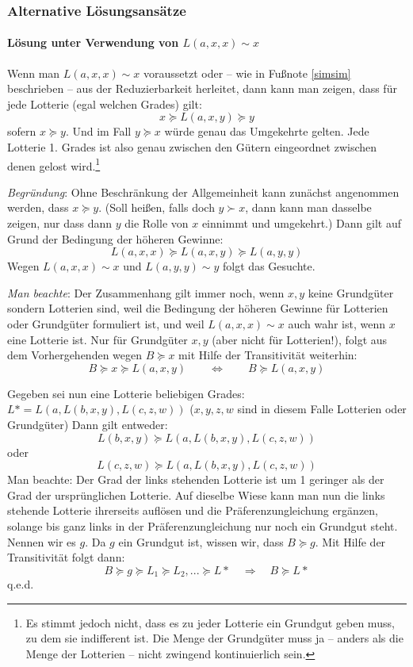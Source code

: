 \documentclass[10pt, a4paper, german]{article}
\numberwithin {equation}{section}
\begin{document}
\subsubsection{Alternative Lösungsansätze}
\label{AlternativLoesung}

\paragraph{Lösung unter Verwendung von $L(a,x,x) \sim x$\\}

Wenn man $L(a,x,x) \sim x$ voraussetzt oder -- wie in Fußnote
\ref{simsim} beschrieben -- aus der Reduzierbarkeit herleitet, dann
kann man zeigen, dass für jede Lotterie (egal welchen Grades) gilt:
\[ x \succeq L(a,x,y) \succeq y \] sofern $x \succeq y$. Und im Fall
$y \succeq x$ würde genau das Umgekehrte gelten. Jede Lotterie
1. Grades ist also genau zwischen den Gütern eingeordnet zwischen
denen gelost wird.\footnote{Es stimmt jedoch nicht, dass es zu jeder
  Lotterie ein Grundgut geben muss, zu dem sie indifferent ist. Die
  Menge der Grundgüter muss ja -- anders als die Menge der Lotterien --
  nicht zwingend kontinuierlich sein.}

\vspace{0.2cm} {\em Begründung}: Ohne Beschränkung der Allgemeinheit kann
zunächst angenommen werden, dass $x \succeq y$. (Soll heißen, falls
doch $y \succ x$, dann kann man dasselbe zeigen, nur dass dann $y$ die
Rolle von $x$ einnimmt und umgekehrt.) Dann gilt auf Grund der
Bedingung der höheren Gewinne:
\[ L(a,x,x) \succeq L(a,x,y) \succeq L(a,y,y) \] 
Wegen $L(a,x,x) \sim
x$ und $L(a,y,y) \sim y$ folgt das Gesuchte. 

\vspace{0.2cm} {\em Man beachte}: Der Zusammenhang gilt immer noch, wenn
$x,y$ keine Grundgüter sondern Lotterien sind, weil die Bedingung der
höheren Gewinne für Lotterien oder Grundgüter formuliert ist, und weil
$L(a,x,x) \sim x$ auch wahr ist, wenn $x$ eine Lotterie ist. Nur für
Grundgüter $x,y$ (aber nicht für Lotterien!), folgt aus dem
Vorhergehenden wegen $B \succeq x$ mit Hilfe der Transitivität
weiterhin:
\[ B \succeq x \succeq L(a,x,y) \qquad \Leftrightarrow \qquad B \succeq L(a,x,y)
\]

\vspace{0.2cm} Gegeben sei nun eine Lotterie beliebigen Grades: $L* = L(a,
L(b,x,y), L(c,z,w))$ ($x,y,z,w$ sind in diesem Falle Lotterien oder
Grundgüter) Dann gilt entweder:
\[ L(b,x,y) \succeq L(a, L(b,x,y), L(c,z,w)) \]
oder
\[ L(c,z,w) \succeq L(a, L(b,x,y), L(c,z,w)) \] Man beachte: Der Grad
der links stehenden Lotterie ist um 1 geringer als der Grad der
ursprünglichen Lotterie. Auf dieselbe Wiese kann man nun die
links stehende Lotterie ihrerseits auflösen und die Präferenzungleichung
ergänzen, solange bis ganz links in der Präferenzungleichung nur noch
ein Grundgut steht. Nennen wir es $g$. Da $g$ ein Grundgut ist, wissen
wir, dass $B \succeq g$. Mit Hilfe der Transitivität folgt dann:
\[ B \succeq g \succeq L_1 \succeq L_2, ... \succeq L* \quad \Rightarrow \quad B \succeq L* \]
q.e.d.
\end{document}

